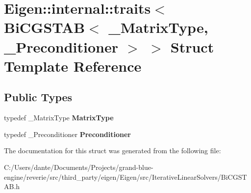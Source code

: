 \hypertarget{struct_eigen_1_1internal_1_1traits_3_01_bi_c_g_s_t_a_b_3_01___matrix_type_00_01___preconditioner_01_4_01_4}{}\section{Eigen\+::internal\+::traits$<$ Bi\+C\+G\+S\+T\+AB$<$ \+\_\+\+Matrix\+Type, \+\_\+\+Preconditioner $>$ $>$ Struct Template Reference}
\label{struct_eigen_1_1internal_1_1traits_3_01_bi_c_g_s_t_a_b_3_01___matrix_type_00_01___preconditioner_01_4_01_4}
\subsection*{Public Types}
\begin{DoxyCompactItemize}
\item 
\mbox{\label{struct_eigen_1_1internal_1_1traits_3_01_bi_c_g_s_t_a_b_3_01___matrix_type_00_01___preconditioner_01_4_01_4_ac1fa0313312d70262ae3f9f04b4d570f}} 
typedef \+\_\+\+Matrix\+Type {\bfseries Matrix\+Type}
\item 
\mbox{\label{struct_eigen_1_1internal_1_1traits_3_01_bi_c_g_s_t_a_b_3_01___matrix_type_00_01___preconditioner_01_4_01_4_a12b0145a10ef0ee5743dd0038027e8de}} 
typedef \+\_\+\+Preconditioner {\bfseries Preconditioner}
\end{DoxyCompactItemize}


The documentation for this struct was generated from the following file\+:\begin{DoxyCompactItemize}
\item 
C\+:/\+Users/dante/\+Documents/\+Projects/grand-\/blue-\/engine/reverie/src/third\+\_\+party/eigen/\+Eigen/src/\+Iterative\+Linear\+Solvers/Bi\+C\+G\+S\+T\+A\+B.\+h\end{DoxyCompactItemize}
